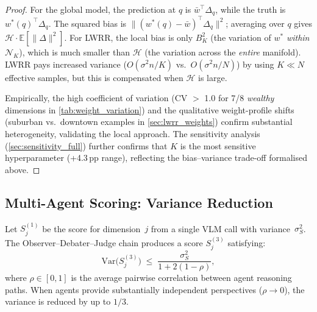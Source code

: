 \documentclass[runningheads]{llncs}
\begin{document}
\begin{proof}
For the global model, the prediction at $q$ is $\bar{w}^{\!\top}\Delta_q$, while the truth is $w^{*\!}(q)^{\!\top}\Delta_q$.
The squared bias is $\|(w^{*\!}(q) - \bar{w})^{\!\top}\Delta_q\|^2$; averaging over $q$ gives $\mathcal{H}\cdot\mathbb{E}[\|\Delta\|^2]$.
For LWRR, the local bias is only $B_K^2$ (the variation of $w^{*}$ \emph{within} $\mathcal{N}_K$), which is much smaller than $\mathcal{H}$ (the variation across the \emph{entire} manifold).
LWRR pays increased variance ($O(\sigma^2 n/K)$ vs.\ $O(\sigma^2 n/N)$) by using $K \ll N$ effective samples, but this is compensated when $\mathcal{H}$ is large.

Empirically, the high coefficient of variation (CV $>$ 1.0 for 7/8 \emph{wealthy} dimensions in \cref{tab:weight_variation}) and the qualitative weight-profile shifts (suburban vs.\ downtown examples in \cref{sec:lwrr_weights}) confirm substantial heterogeneity, validating the local approach.
The sensitivity analysis (\cref{sec:sensitivity_full}) further confirms that $K$ is the most sensitive hyperparameter (+4.3\,pp range), reflecting the bias--variance trade-off formalised above.
\end{proof}

\subsection{Multi-Agent Scoring: Variance Reduction}
\label{sec:theory_multiagent}

\begin{proposition}\label{prop:multiagent}
Let $S_j^{(1)}$ be the score for dimension~$j$ from a single VLM call with variance~$\sigma_S^2$.
The Observer--Debater--Judge chain produces a score $S_j^{(3)}$ satisfying:
\begin{equation}
\mathrm{Var}\bigl(S_j^{(3)}\bigr) \;\leq\; \frac{\sigma_S^2}{1 + 2(1-\rho)},
\label{eq:var_reduction}
\end{equation}
where $\rho \in [0,1]$ is the average pairwise correlation between agent reasoning paths.
When agents provide substantially independent perspectives ($\rho \to 0$), the variance is reduced by up to $1/3$.
\end{proposition}
\end{document}
